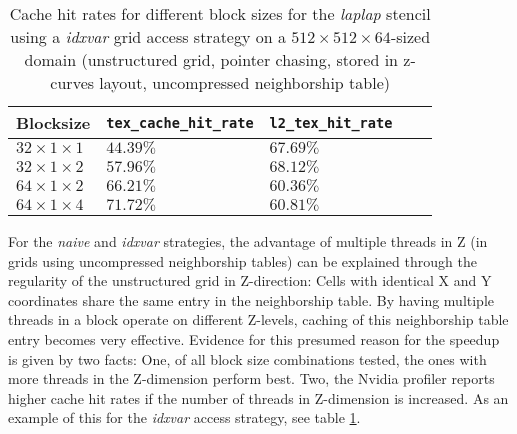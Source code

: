 \begin{table}
    \begin{tabular}{l l l p{2cm} p{2cm}}
        \hline
        \textbf{Blocksize} & \textbf{\texttt{tex\_\allowbreak cache\_\allowbreak hit\_\allowbreak rate}} & \textbf{\texttt{l2\_\allowbreak tex\_\allowbreak hit\_\allowbreak rate}} \\
        \hline
        \hline
        $32\times 1\times 1$ & $44.39\%$ & $67.69\%$ \\
        $32\times 1\times 2$ & $57.96\%$ & $68.12\%$ \\
        $64\times 1\times 2$ & $66.21\%$ & $60.36\%$ \\
        $64\times 1\times 4$ & $71.72\%$ & $60.81\%$ \\
        \hline
    \end{tabular}
    \caption{\label{tab:laplap-blocksize-metrics} Cache hit rates for different block sizes for the \emph{laplap} stencil using a \emph{idxvar} grid access strategy on a $512\times 512\times 64$-sized domain (unstructured grid, pointer chasing, stored in z-curves layout, uncompressed neighborship table)}
\end{table}

For the \emph{naive} and \emph{idxvar} strategies, the advantage of multiple threads in Z (in grids using uncompressed neighborship tables) can be explained through the regularity of the unstructured grid in Z-direction: Cells with identical X and Y coordinates share the same entry in the neighborship table. By having multiple threads in a block operate on different Z-levels, caching of this neighborship table entry becomes very effective. Evidence for this presumed reason for the speedup is given by two facts: One, of all block size combinations tested, the ones with more threads in the Z-dimension perform best. Two, the Nvidia profiler reports higher cache hit rates if the number of threads in Z-dimension is increased. As an example of this for the \emph{idxvar} access strategy, see table \ref{tab:laplap-blocksize-metrics}.

